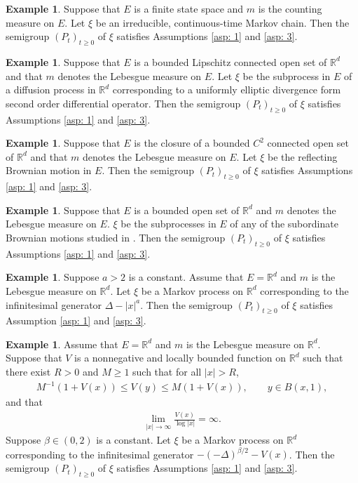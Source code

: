 \documentclass[12pt,a4paper]{amsart}
\theoremstyle{definition}
\newtheorem{exa}[thm]{Example}
\numberwithin{equation}{section}
\begin{document}
\begin{exa}
  Suppose that $E$ is a finite state space and $m$ is the counting measure on $E$. 
  Let $\xi$ be an irreducible, continuous-time Markov chain. 
  Then the semigroup $(P_t)_{t\ge 0}$ of $\xi$ satisfies Assumptions \ref{asp: 1} and \ref{asp: 3}.
\end{exa}

\begin{exa} 
Suppose that $E$ is a bounded Lipschitz connected  open set of $\mathbb R^d$ and that $m$ denotes the Lebesgue measure on $E$.
Let $\xi$ be the subprocess in $E$ of a diffusion process in $\mathbb{R}^d$ corresponding to a uniformly elliptic divergence form second order differential operator.  
Then the semigroup $(P_t)_{t\ge 0}$ of $\xi$ satisfies Assumptions \ref{asp: 1} and \ref{asp: 3}.
\end{exa}

\begin{exa}
Suppose that $E$ is the closure of a bounded $C^2$ connected  open set of $\mathbb R^d$ and that $m$ denotes the Lebesgue measure on $E$.
Let $\xi$ be the reflecting Brownian motion in $E$. 
Then the semigroup $(P_t)_{t\ge 0}$ of $\xi$ satisfies
Assumptions \ref{asp: 1} and \ref{asp: 3}. 
\end{exa}

\begin{exa}
  Suppose that $E$ is a bounded   open set of $\mathbb R^d$ and  $m$ denotes the Lebesgue measure on $E$.
  $\xi$ be the subprocesses in $E$ of any of the subordinate Brownian motions studied in \cite{KSV1, KSV2}.  
  Then the semigroup $(P_t)_{t\ge 0}$ of $\xi$ satisfies Assumptions \ref{asp: 1} and \ref{asp: 3}. 
\end{exa}

\begin{exa}
  Suppose $a>2$ is a constant.
  Assume that $E=\mathbb{R}^d$ and $m$ is the Lebesgue measure on $\mathbb{R}^d$.
  Let $\xi$ be a Markov process on $\mathbb{R}^d$ corresponding to the infinitesimal generator $\Delta-|x|^a$. 
  Then the semigroup $(P_t)_{t\ge 0}$ of $\xi$ satisfies Assumption \ref{asp: 1} and \ref{asp: 3}. 
\end{exa}

\begin{exa} 
  Assume that $E=\mathbb{R}^d$ and $m$ is the Lebesgue measure on $\mathbb{R}^d$.
  Suppose that $V$ is a nonnegative and locally bounded function on  $\mathbb{R}^d$ such that there exist $R>0$ and $M\ge 1$ such that for all $|x|>R$,
  \begin{align}
    M^{-1}(1+V(x))\le V(y)\le M(1+V(x)), \qquad y\in B(x, 1),
  \end{align}
  and that
  \begin{align}
    \lim_{|x|\to\infty}\frac{V(x)}{\log|x|}=\infty.
  \end{align}
  Suppose $\beta\in (0, 2)$ is a constant.
  Let $\xi$ be a Markov process on $\mathbb{R}^d$ corresponding to the infinitesimal generator $-(-\Delta)^{\beta/2}-V(x)$. 
  Then the semigroup $(P_t)_{t\ge 0}$ of $\xi$ satisfies
  Assumptions \ref{asp: 1} and \ref{asp: 3}. 
\end{exa}
\end{document}
